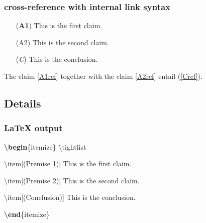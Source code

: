 \documentclass[
]{article}
\makeatletter
\newenvironment{Shaded}{}{}
\newcommand{\ExtensionTok}[1]{#1}
\newcommand{\FunctionTok}[1]{\textcolor[rgb]{0.02,0.16,0.49}{#1}}
\newcommand{\KeywordTok}[1]{\textcolor[rgb]{0.00,0.44,0.13}{\textbf{#1}}}
\newcommand{\NormalTok}[1]{#1}
\providecommand{\tightlist}{%
  \setlength{\itemsep}{0pt}\setlength{\parskip}{0pt}}
\def\labelledlistlabel#1#2{\begingroup
    \def\@currentlabel{#2}%
    \label{#1}\endgroup
    }
\makeatother
\begin{document}
\hypertarget{cross-reference-with-internal-link-syntax}{%
\subsubsection{cross-reference with internal link
syntax}\label{cross-reference-with-internal-link-syntax}}

\begin{itemize}
\tightlist

\item[(\textbf{A1})\labelledlistlabel{A1ref}{\textbf{A1}}] This is the
first claim.

\item[(A2)\labelledlistlabel{A2ref}{A2}] This is the second claim.

\item[(\emph{C})\labelledlistlabel{Cref}{\emph{C}}] This is the
conclusion.

\end{itemize}

The claim \ref{A1ref} together with the claim \ref{A2ref} entail
(\ref{Cref}).

\hypertarget{details}{%
\subsection{Details}\label{details}}

\hypertarget{latex-output}{%
\subsubsection{LaTeX output}\label{latex-output}}

\begin{Shaded}
\begin{Highlighting}[]
\KeywordTok{\textbackslash{}begin}\NormalTok{\{}\ExtensionTok{itemize}\NormalTok{\}}
\FunctionTok{\textbackslash{}tightlist}

\FunctionTok{\textbackslash{}item}\NormalTok{[(Premise 1)] This is the first claim.}

\FunctionTok{\textbackslash{}item}\NormalTok{[(Premise 2)] This is the second claim.}

\FunctionTok{\textbackslash{}item}\NormalTok{[(Conclusion)] This is the conclusion.}

\KeywordTok{\textbackslash{}end}\NormalTok{\{}\ExtensionTok{itemize}\NormalTok{\}}
\end{Highlighting}
\end{Shaded}
\end{document}
